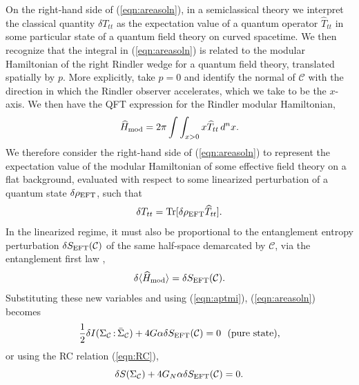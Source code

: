 \documentclass[%
preprint,
nofootinbib,
amsmath,amssymb,
aps,
prd,
showpacs,
superscriptaddress
]{revtex4-1}
\DeclareMathOperator{\Tr}{Tr}
\newcommand{\region}{\Sigma}
\DeclareMathOperator{\co}{:}
\begin{document}
On the right-hand side of (\ref{eqn:areasoln}), in a semiclassical theory we interpret the classical quantity $\delta T_{tt}$ as the expectation value of a quantum operator $\widehat{T}_{tt}$ in some particular state of a quantum field theory on curved spacetime.
We then recognize that the integral in (\ref{eqn:areasoln}) is related to the modular Hamiltonian of the right Rindler wedge for a quantum field theory, translated spatially by $p$. More explicitly, take $p=0$ and identify the normal of $\mathcal{C}$ with the direction in which the Rindler observer accelerates, which we take to be the $x$-axis.
We then have the QFT expression for the Rindler modular Hamiltonian,
\begin{equation}
\widehat{H}_{\rm mod}=2\pi\int\int_{x>0} x \widehat{T}_{tt} \, d^n x.
\end{equation}
We therefore consider the right-hand side of (\ref{eqn:areasoln}) to represent the expectation value of the modular Hamiltonian of some effective field theory on a flat background, evaluated with respect to some linearized perturbation of a quantum state $\delta \rho_{\rm EFT}$, such that 
\begin{equation}
\delta T_{tt}= \Tr[\delta\rho_{\rm EFT}\widehat{T}_{tt}]. 
\end{equation}
In the linearized regime, it must also be proportional to the entanglement entropy perturbation $\delta S_{\rm EFT}(\mathcal{C})$ of the same half-space demarcated by $\mathcal{C}$, via the entanglement first law \cite{Blanco:2013joa},
\begin{equation}
\delta\langle \widehat H_{\rm mod}\rangle=\delta S_{\rm EFT}(\mathcal{C}).
\end{equation}
Substituting these new variables and using (\ref{eqn:aptmi}), (\ref{eqn:areasoln}) becomes
\begin{equation}
\frac 1 2\delta I({\region}_{\mathcal{C}}\co\bar{{\region}}_{\mathcal{C}}) +4G\alpha\delta S_{\rm EFT}(\mathcal{C})=0 ~~\rm (pure~state),
\end{equation}
or using the RC relation (\ref{eqn:RC}), 
\begin{equation}
 \delta S({\region}_{\mathcal{C}})+4G_N\alpha\delta S_{\rm EFT}(\mathcal{C})=0.
\label{eqn:EEEC}
\end{equation}
\end{document}
